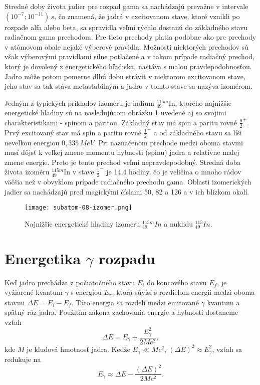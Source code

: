 \documentclass[../../main.tex]{subfiles}
\begin{document}
Stredné doby života jadier pre rozpad gama sa nachádzajú prevažne v intervale $(10^{-7}; 10^{-11})\,s$, čo znamená, že jadrá v excitovanom stave, ktoré vznikli po rozpade alfa alebo beta, sa spravidla veľmi rýchlo dostanú do základného stavu radiačnom gama prechodom. Pre tieto prechody platia podobne ako pre prechody v atómovom obale nejaké výberové pravidla. Možnosti niektorých prechodov sú však výberovými pravidlami silne potlačené a v takom prípade radiačný prechod, ktorý je dovolený z energetického hľadiska, nastáva s malou pravdepodobnosťou. Jadro môže potom pomerne dlhú dobu stráviť v niektorom excitovanom stave, jeho stav sa tak stáva metastabilným a jadro v tomto stave sa nazýva izomérom.

Jedným z typických príkladov izoméru je indium $^{115m}_{49}$In, ktorého najnižšie energetické hladiny sú na nasledujúcom obrázku \ref{sf8:fig:izomer} uvedené aj so svojimi charakteristikami - spinom a paritou. Základný stav má spin a paritu rovné $\frac{9}{2}^+$. Prvý excitovaný stav má spin a paritu rovné $\frac{1}{2}^-$ a od základného stavu sa líši neveľkou energiou $0,335\,\unit{MeV}$. Pri naznačenom prechode medzi oboma stavmi musí dôjsť k veľkej zmene momentu hybnosti (spinu) jadra a relatívne malej zmene energie. Preto je tento prechod veľmi nepravdepodobný. Stredná doba života izoméru $^{115m}_{49}$In v stave $\frac{1}{2}^-$ je 14,4 hodiny, čo je veličina o mnoho rádov väčšia než v obvyklom prípade radiačného prechodu gama. Oblasti izomerických jadier sa nachádzajú pred magickými číslami 50, 82 a 126 a v ich blízkom okolí.

\begin{figure}[!h]
\texttt{[image: subatom-08-izomer.png]}
\centering
\caption{Najnižšie energetické hladiny izomeru $^{115m}_{49}In$ a nuklidu $^{115}_{49}In$.}
\label{sf8:fig:izomer}
\end{figure}

\section{Energetika $\gamma$ rozpadu}
Keď jadro prechádza z počiatočného stavu $E_i$ do koncového stavu $E_f$, je vyžiarené kvantum $\gamma$ s energiou $E_{\gamma}$, ktorá súvisí s rozdielom energii medzi oboma stavmi  $\Delta E = E_i - E_f$. Táto energia sa rozdelí medzi emitované $\gamma$ kvantum a spätný ráz jadra. Použitím zákona zachovania energie a hybnosti dostaneme vzťah
$$ \Delta E = E_{\gamma} + \frac{E^2_{\gamma}}{2Mc^2}, $$
kde $M$ je kľudová hmotnosť jadra. Keďže $E_{\gamma} \ll Mc^2$, $(\Delta E)^2 \approx E^2_{\gamma}$, vzťah sa redukuje na 
$$ E_{\gamma} \approx \Delta E - \frac{(\Delta E)^2}{2Mc^2}. $$
\end{document}
